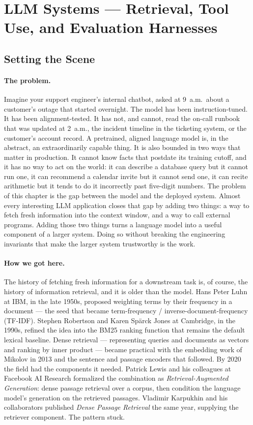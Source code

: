 \section{LLM Systems --- Retrieval, Tool Use, and Evaluation Harnesses}

\subsection*{Setting the Scene}

\paragraph{The problem.}
Imagine your support engineer's internal chatbot, asked at 9~a.m.\
about a customer's outage that started overnight. The model has
been instruction-tuned. It has been alignment-tested. It has not,
and cannot, read the on-call runbook that was updated at 2~a.m.,
the incident timeline in the ticketing system, or the customer's
account record. A pretrained, aligned language model is, in the
abstract, an extraordinarily capable thing. It is also bounded in two ways that
matter in production. It cannot know facts that postdate its
training cutoff, and it has no way to act on the world: it can
describe a database query but it cannot run one, it can recommend a
calendar invite but it cannot send one, it can recite arithmetic
but it tends to do it incorrectly past five-digit numbers. The
problem of this chapter is the gap between the model and the
deployed system. Almost every interesting LLM application closes
that gap by adding two things: a way to fetch fresh information into
the context window, and a way to call external programs. Adding
those two things turns a language model into a useful component of
a larger system. Doing so without breaking the engineering invariants
that make the larger system trustworthy is the work.

\paragraph{How we got here.}
The history of fetching fresh information for a downstream task is,
of course, the history of information retrieval, and it is older than
the model. Hans Peter Luhn at IBM, in the late 1950s, proposed
weighting terms by their frequency in a document --- the seed that
became term-frequency / inverse-document-frequency (TF-IDF). Stephen
Robertson and Karen Sp\"arck Jones at Cambridge, in the 1990s,
refined the idea into the BM25 ranking function that remains the
default lexical baseline. Dense retrieval --- representing queries
and documents as vectors and ranking by inner product --- became
practical with the embedding work of Mikolov in 2013 and the
sentence and passage encoders that followed. By 2020 the field had
the components it needed. Patrick Lewis and his colleagues at
Facebook AI Research formalized the combination as
\emph{Retrieval-Augmented Generation}: dense passage retrieval over
a corpus, then condition the language model's generation on the
retrieved passages. Vladimir Karpukhin and his collaborators
published \emph{Dense Passage Retrieval} the same year, supplying
the retriever component. The pattern stuck.

